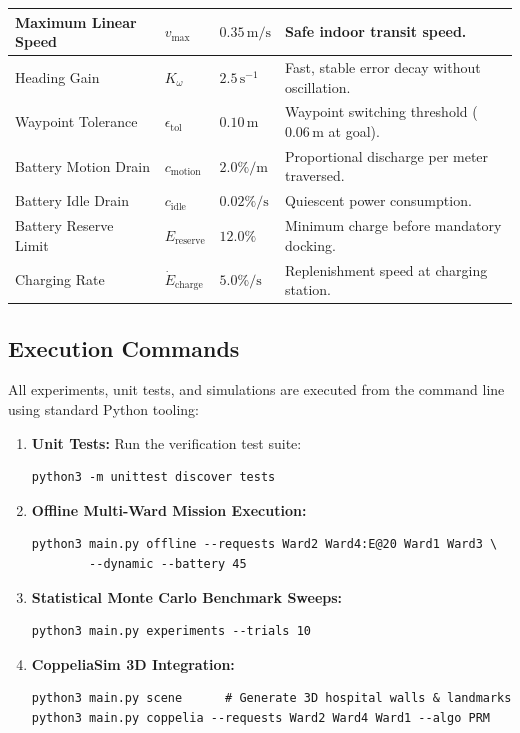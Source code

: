 \documentclass[12pt,a4paper]{article}
\begin{document}
\begin{table}[H]
{\begin{tabular}{|P{4.4cm}|C{1.8cm}|C{2.4cm}|P{6.6cm}|}
Maximum Linear Speed & $v_{\max}$ & $0.35\,\text{m/s}$ & Safe indoor transit speed. \\ \hline
Heading Gain & $K_\omega$ & $2.5\,\text{s}^{-1}$ & Fast, stable error decay without oscillation. \\ \hline
Waypoint Tolerance & $\epsilon_{\text{tol}}$ & $0.10\,\text{m}$ & Waypoint switching threshold ($0.06\,\text{m}$ at goal). \\ \hline
Battery Motion Drain & $c_{\text{motion}}$ & $2.0\%/\text{m}$ & Proportional discharge per meter traversed. \\ \hline
Battery Idle Drain & $c_{\text{idle}}$ & $0.02\%/\text{s}$ & Quiescent power consumption. \\ \hline
Battery Reserve Limit & $E_{\text{reserve}}$ & $12.0\%$ & Minimum charge before mandatory docking. \\ \hline
Charging Rate & $\dot{E}_{\text{charge}}$ & $5.0\%/\text{s}$ & Replenishment speed at charging station. \\ \hline
\end{tabular}%
}
\end{table}

\subsection{Execution Commands}
All experiments, unit tests, and simulations are executed from the command line using standard Python tooling:
\begin{enumerate}[itemsep=2pt,topsep=2pt]
\item \textbf{Unit Tests:} Run the verification test suite:
\begin{verbatim}
python3 -m unittest discover tests
\end{verbatim}
\item \textbf{Offline Multi-Ward Mission Execution:}
\begin{verbatim}
python3 main.py offline --requests Ward2 Ward4:E@20 Ward1 Ward3 \
        --dynamic --battery 45
\end{verbatim}
\item \textbf{Statistical Monte Carlo Benchmark Sweeps:}
\begin{verbatim}
python3 main.py experiments --trials 10
\end{verbatim}
\item \textbf{CoppeliaSim 3D Integration:}
\begin{verbatim}
python3 main.py scene      # Generate 3D hospital walls & landmarks
python3 main.py coppelia --requests Ward2 Ward4 Ward1 --algo PRM
\end{verbatim}
\end{enumerate}
\end{document}
